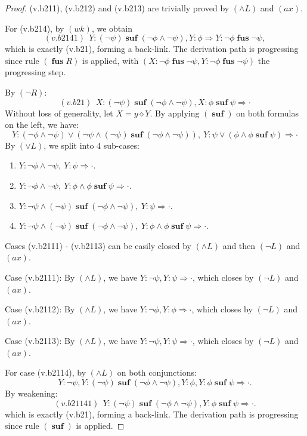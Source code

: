 \documentclass[manuscript,screen]{acmart}
\newcommand{\cat}[0]{\diamond}
\DeclareMathOperator{\osuf}{\mathbf{suf}}
\DeclareMathOperator{\ofus}{\mathbf{fus}}
\begin{document}
\begin{proof}
(v.b211), (v.b212) and (v.b213) are trivially proved by $(\wedge L)$ and $(ax)$. 

For (v.b214), by $(wk)$, we obtain
$$
(v.b2141)\ \ Y : (\neg\psi)\osuf(\neg\phi\wedge\neg\psi), Y : \phi\Rightarrow Y: \neg \phi\ofus\neg\psi, 
$$
which is exactly (v.b21), forming a back-link. The derivation path is progressing since rule $(\ofus R)$ is applied, with $(X : \neg\phi\ofus\neg\psi, Y : \neg\phi\ofus \neg\psi)$ the progressing step. 


\ifx
By $(\neg R)$:
$$
(v.b21)\ \ X : (\neg\psi)\osuf(\neg\phi\wedge \neg\psi), X : \phi\osuf\psi\Rightarrow \cdot
$$
Without loss of generality, let $X = y\cat Y$. By applying $(\osuf)$ on both formulas on the left, we have:
$$
Y : (\neg\phi\wedge\neg\psi)\vee (\neg\psi\wedge (\neg\psi)\osuf(\neg\phi\wedge\neg\psi)),\ Y : \psi\vee (\phi\wedge \phi\osuf\psi)\Rightarrow \cdot
$$
By $(\vee L)$, we split into 4 sub-cases:
\begin{enumerate}
    \item[(v.b2111)] $Y : \neg\phi\wedge\neg\psi,\ Y : \psi\Rightarrow \cdot$.
    \item[(v.b2112)] $Y : \neg\phi\wedge\neg\psi,\ Y : \phi\wedge\phi\osuf\psi\Rightarrow \cdot$.
    \item[(v.b2113)] $Y : \neg\psi\wedge (\neg\psi)\osuf(\neg\phi\wedge\neg\psi),\ Y : \psi\Rightarrow \cdot$.
    \item[(v.b2114)] $Y : \neg\psi\wedge (\neg\psi)\osuf(\neg\phi\wedge\neg\psi),\ Y : \phi\wedge\phi\osuf\psi\Rightarrow \cdot$.
\end{enumerate}
Cases (v.b2111) - (v.b2113) can be easily closed by $(\wedge L)$ and then $(\neg L)$ and $(\textit{ax})$. 

\ifx
Case (v.b2111): By $(\wedge L)$, we have $Y : \neg\psi, Y : \psi\Rightarrow \cdot$, which closes by $(\neg L)$ and $(\textit{ax})$.

Case (v.b2112): By $(\wedge L)$, we have $Y : \neg\phi, Y : \phi\Rightarrow \cdot$, which closes by $(\neg L)$ and $(\textit{ax})$.

Case (v.b2113): By $(\wedge L)$, we have $Y : \neg\psi, Y : \psi\Rightarrow \cdot$, which closes by $(\neg L)$ and $(\textit{ax})$.
\fi

For case (v.b2114), by $(\wedge L)$ on both conjunctions:
$$
Y : \neg\psi, Y : (\neg\psi)\osuf(\neg\phi\wedge\neg\psi), Y : \phi, Y : \phi\osuf\psi\Rightarrow \cdot.
$$
By weakening:
$$
(v.b21141)\ \ Y : (\neg\psi)\osuf(\neg\phi\wedge\neg\psi), Y : \phi\osuf\psi\Rightarrow \cdot.
$$
which is exactly (v.b21), forming a back-link. The derivation path is progressing since rule $(\osuf)$ is applied.
\fi
\end{proof}
\end{document}
